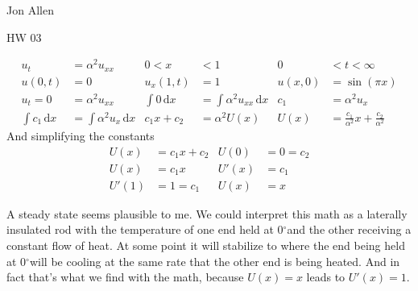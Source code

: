 \documentclass{article}
\newcommand{\degree}{\ensuremath{^\circ}}
\begin{document}
Jon Allen

HW 03

\begin{align*}
  u_t&=\alpha^2 u_{xx} & 0< x&<1 & 0&<t<\infty\\
  u(0,t)&=0 & u_x(1,t)&=1 & u(x,0)&=\sin (\pi x)\\
  u_t=0&=\alpha^2u_{xx} &
  \int{0\,\mathrm{d}x}&=\int{\alpha^2u_{xx}\,\mathrm{d}x} &
  c_1&=\alpha^2u_x\\
  \int{c_1\,\mathrm{d}x}&=\int{\alpha^2u_{x}\,\mathrm{d}x} &
  c_1x+c_2&=\alpha^2U(x) &
  U(x)&=\frac{c_1}{\alpha^2}x+\frac{c_2}{\alpha^2}
\end{align*}
And simplifying the constants
\begin{align*}
  U(x)&=c_1x+c_2 & U(0)&=0=c_2\\
  U(x)&=c_1x & U'(x)&=c_1\\
  U'(1)&=1=c_1 & U(x)&=x
\end{align*}

A steady state seems plausible to me. We could interpret this math as a laterally insulated rod with the temperature of one end held at 0\degree and the other receiving a constant flow of heat. At some point it will stabilize to where the end being held at 0\degree will be cooling at the same rate that the other end is being heated. And in fact that's what we find with the math, because $U(x)=x$ leads to $U'(x)=1$.
\end{document}
